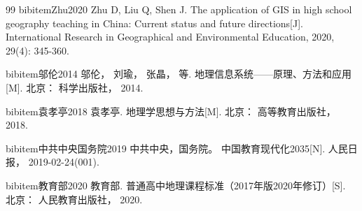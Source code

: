 \documentclass[12pt, a4paper]{article}
\begin{document}
\begin{thebibliography}{99}
bibitem{Zhu2020}
Zhu D, Liu Q, Shen J. The application of GIS in high school geography teaching in China: Current status and future directions[J]. International Research in Geographical and Environmental Education, 2020, 29(4): 345-360.

bibitem{邬伦2014}
邬伦， 刘瑜， 张晶， 等. 地理信息系统——原理、方法和应用[M]. 北京： 科学出版社， 2014.

bibitem{袁孝亭2018}
袁孝亭. 地理学思想与方法[M]. 北京： 高等教育出版社， 2018.

bibitem{中共中央国务院2019}
中共中央，国务院。 中国教育现代化2035[N]. 人民日报， 2019-02-24(001).

bibitem{教育部2020}
教育部. 普通高中地理课程标准（2017年版2020年修订）[S]. 北京： 人民教育出版社， 2020.

\end{thebibliography}
\end{document}
